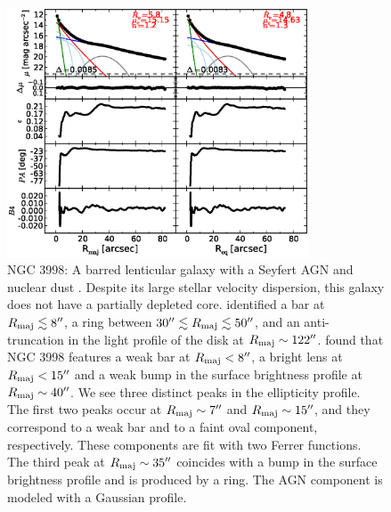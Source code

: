 \documentclass[preprint2]{emulateapj}
\newcommand{\fitfigurewidth}{0.8\textwidth}
\begin{document}
  \begin{figure}[h]
  \begin{center}
  \includegraphics[width=\fitfigurewidth]{images/n3998_1Dfit.eps}
  \caption{NGC 3998: 
  A barred lenticular galaxy with a Seyfert AGN and nuclear dust \citep{knapp1996n3998}.
  Despite its large stellar velocity dispersion, this galaxy does not have a partially depleted core. 
  \cite{gutierrez2011} identified a bar at $R_{\rm maj} \lesssim 8''$, a ring between $30'' \lesssim R_{\rm maj} \lesssim 50''$, and  
  an anti-truncation in the light profile of the disk at $R_{\rm maj} \sim 122''$.
  \cite{laurikainen2010} found that NGC 3998 features a weak bar at $R_{\rm maj} < 8''$,
  a bright lens at $R_{\rm maj} < 15''$ and a weak bump in the surface brightness profile at $R_{\rm maj} \sim 40''$.
  We see three distinct peaks in the ellipticity profile.
  The first two peaks occur at $R_{\rm maj} \sim 7''$ and $R_{\rm maj} \sim 15''$, and they correspond to a weak bar and to a faint 
  oval component, respectively.
  These components are fit with two Ferrer functions.
  The third peak at $R_{\rm maj} \sim 35''$ coincides with a bump in the surface brightness profile and is produced by a ring.
  The AGN component is modeled with a Gaussian profile.
  }
  \end{center}
  \end{figure}
\end{document}
